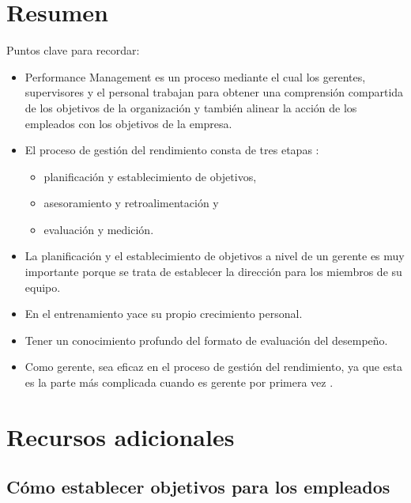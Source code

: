 \documentclass[10pt]{book}
\begin{document}
\section{Resumen}
Puntos clave para recordar:
\begin{itemize}
\item Performance Management es un proceso mediante el cual los gerentes, supervisores y el personal trabajan para obtener una comprensión compartida de los objetivos de la organización y también alinear la acción de los empleados con los objetivos de la empresa.
\item El proceso de gestión del rendimiento consta de tres etapas : 
\begin{itemize}
\item planificación y establecimiento de objetivos,
\item asesoramiento y retroalimentación y
\item evaluación y medición.
\end{itemize}
\item La planificación y el establecimiento de objetivos a nivel de un gerente es muy importante porque se trata de establecer la dirección para los miembros de su equipo.
\item  En el entrenamiento yace su propio crecimiento personal.
\item Tener un conocimiento profundo del formato de evaluación del desempeño.
\item Como gerente, sea eficaz en el proceso de gestión del rendimiento, ya que esta es la parte más complicada cuando es gerente por primera vez .
\end{itemize}
\section{Recursos adicionales}
\subsection{Cómo establecer objetivos para los empleados}
\end{document}
